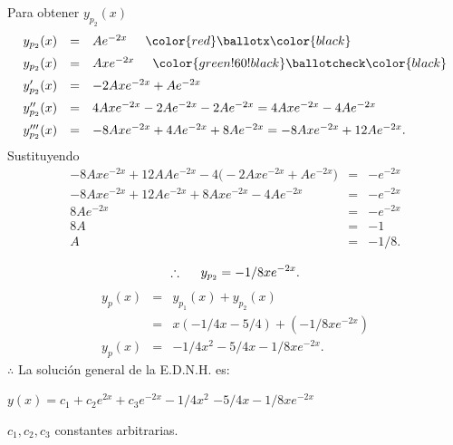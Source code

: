 \documentclass[9pt]{beamer}
\begin{document}
\begin{frame}[t]
	\begin{exampleblock}{}
		Para obtener \(y_{p_2} (x)\)
		\[
			\begin{array}{rcl}
				y_{p_2} (x) & = & Ae^{-2x} \hspace{5mm} \color{red} \ballotx \color{black} \\[2mm]
				y_{p_2} (x) & = & Axe^{-2x} \hspace{5mm} \color{green!60!black} \ballotcheck \color{black} \\[2mm]
				y_{p_2} '(x) & = & -2Axe^{-2x} + Ae^{-2x} \\[2mm]
				y_{p_2} '' (x) & = & 4Axe^{-2x} -2Ae^{-2x} -2Ae^{-2x} = 4Axe^{-2x} -4Ae^{-2x} \\[2mm]
				y_{p_2} ''' (x) & = & -8Axe^{-2x} +4Ae^{-2x} +8Ae^{-2x} = -8Axe^{-2x} +12Ae^{-2x}.
			\end{array}
		\]
		Sustituyendo
		\[
			\begin{array}{rcl}
				-8Axe^{-2x} +12AAe^{-2x} -4 \big(-2Axe^{-2x} +Ae^{-2x}\big) & = & -e^{-2x} \\[2mm]
				-8Axe^{-2x} +12Ae^{-2x} +8Axe^{-2x} -4Ae^{-2x} & = & -e^{-2x} \\[2mm]
				8Ae^{-2x} & = & -e^{-2x} \\[2mm]
				8A & = & -1 \\[2mm]
				A & = & -1/8.
			\end{array}
		\]
	\end{exampleblock}
\end{frame}

\begin{frame}[t]
	\begin{exampleblock}{}
		\[
			\therefore \hspace{5mm} y_{p_2} = -1/8xe^{-2x}.
		\]
		\[
			\begin{array}{rcl}
				y_p(x) & = & y_{p_1} (x) + y_{p_2} (x) \\[2mm]
				& = & x(-1/4x-5/4) + (-1/8xe^{-2x}) \\[2mm]
				y_p(x) & = & -1/4x^2-5/4x-1/8xe^{-2x} .
			\end{array}
		\]
		\(\therefore\) \hspace{5mm} La solución general de la E.D.N.H. es:
		\begin{center}
			\(y(x) =c_1+c_2e^{2x} + c_3e^{-2x} -1/4x^2\) \color{red} \underline{\color{black} \(-5/4x-1/8xe^{-2x}\)}
		\end{center}
		\(c_1,c_2,c_3\) constantes arbitrarias.
	\end{exampleblock}
\end{frame}
\end{document}
